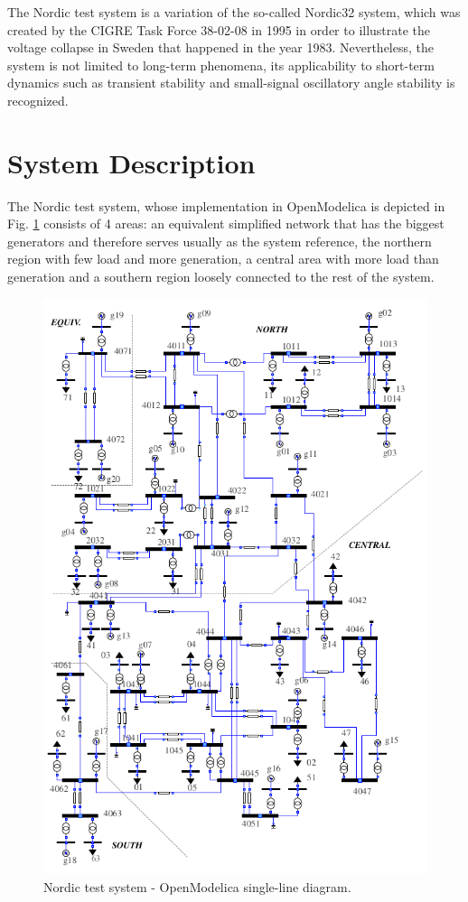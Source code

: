 \documentclass[a4paper, 12pt]{report}
\begin{document}
The Nordic test system is a variation of the so-called Nordic32 system, which was created by the CIGRE Task Force 38-02-08 in 1995 in order to illustrate the voltage collapse in Sweden that happened in the year 1983. Nevertheless, the system is not limited to long-term phenomena, its applicability to short-term dynamics such as transient stability and small-signal oscillatory angle stability is recognized.

\section{System Description}\label{Secc: System Description}

The Nordic test system, whose implementation in OpenModelica is depicted in Fig. \ref{fig: single_line} consists of 4 areas: an equivalent simplified network that has the biggest generators and therefore serves usually as the system reference, the northern region with few load and more generation, a central area with more load than generation and a southern region loosely connected to the rest of the system.

\begin{figure}[H]
\includegraphics[scale=0.5]{Nordic.png}
  \caption{Nordic test system - OpenModelica single-line diagram.}
  \label{fig: single_line}
\end{figure}
\end{document}
